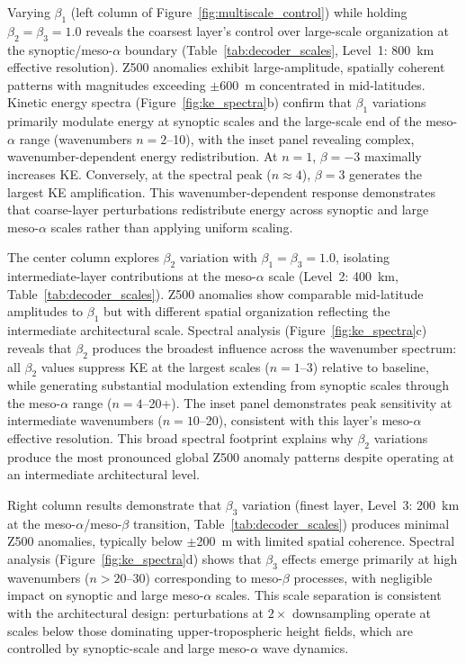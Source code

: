 \documentclass{agujournal2019}
\begin{document}
Varying $\beta_1$ (left column of Figure~\ref{fig:multiscale_control}) while holding $\beta_2 = \beta_3 = 1.0$ reveals the coarsest layer's control over large-scale organization at the synoptic/meso-$\alpha$ boundary (Table~\ref{tab:decoder_scales}, Level~1: 800~km effective resolution). Z500 anomalies exhibit large-amplitude, spatially coherent patterns with magnitudes exceeding $\pm$600~m concentrated in mid-latitudes. Kinetic energy spectra (Figure~\ref{fig:ke_spectra}b) confirm that $\beta_1$ variations primarily modulate energy at synoptic scales and the large-scale end of the meso-$\alpha$ range (wavenumbers $n=2$--10), with the inset panel revealing complex, wavenumber-dependent energy redistribution. At $n=1$, $\beta=-3$ maximally increases KE. Conversely, at the spectral peak ($n \approx 4$), $\beta=3$ generates the largest KE amplification. This wavenumber-dependent response demonstrates that coarse-layer perturbations redistribute energy across synoptic and large meso-$\alpha$ scales rather than applying uniform scaling.

The center column explores $\beta_2$ variation with $\beta_1 = \beta_3 = 1.0$, isolating intermediate-layer contributions at the meso-$\alpha$ scale (Level~2: 400~km, Table~\ref{tab:decoder_scales}). Z500 anomalies show comparable mid-latitude amplitudes to $\beta_1$ but with different spatial organization reflecting the intermediate architectural scale. Spectral analysis (Figure~\ref{fig:ke_spectra}c) reveals that $\beta_2$ produces the broadest influence across the wavenumber spectrum: all $\beta_2$ values suppress KE at the largest scales ($n=1$--3) relative to baseline, while generating substantial modulation extending from synoptic scales through the meso-$\alpha$ range ($n=4$--20+). The inset panel demonstrates peak sensitivity at intermediate wavenumbers ($n=10$--20), consistent with this layer's meso-$\alpha$ effective resolution. This broad spectral footprint explains why $\beta_2$ variations produce the most pronounced global Z500 anomaly patterns despite operating at an intermediate architectural level.

Right column results demonstrate that $\beta_3$ variation (finest layer, Level~3: 200~km at the meso-$\alpha$/meso-$\beta$ transition, Table~\ref{tab:decoder_scales}) produces minimal Z500 anomalies, typically below $\pm$200~m with limited spatial coherence. Spectral analysis (Figure~\ref{fig:ke_spectra}d) shows that $\beta_3$ effects emerge primarily at high wavenumbers ($n>20$--30) corresponding to meso-$\beta$ processes, with negligible impact on synoptic and large meso-$\alpha$ scales. This scale separation is consistent with the architectural design: perturbations at $2\times$ downsampling operate at scales below those dominating upper-tropospheric height fields, which are controlled by synoptic-scale and large meso-$\alpha$ wave dynamics.
\end{document}
